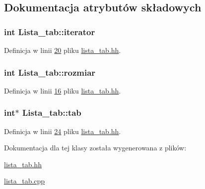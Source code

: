 \subsection{Dokumentacja atrybutów składowych}
\hypertarget{class_lista__tab_afd2c6ba3ae15e658890641b188c7ed39}{
\subsubsection[{iterator}]{\setlength{\rightskip}{0pt plus 5cm}int Lista\-\_\-tab\-::iterator}}\label{class_lista__tab_afd2c6ba3ae15e658890641b188c7ed39}


Definicja w linii \hyperlink{lista__tab_8hh_source_l00020}{20} pliku \hyperlink{lista__tab_8hh_source}{lista\-\_\-tab.\-hh}.

\hypertarget{class_lista__tab_a59e0425d896070457d1f3456b91842fd}{
\subsubsection[{rozmiar}]{\setlength{\rightskip}{0pt plus 5cm}int Lista\-\_\-tab\-::rozmiar}}\label{class_lista__tab_a59e0425d896070457d1f3456b91842fd}


Definicja w linii \hyperlink{lista__tab_8hh_source_l00016}{16} pliku \hyperlink{lista__tab_8hh_source}{lista\-\_\-tab.\-hh}.

\hypertarget{class_lista__tab_a123dfb670e5a5592e512c41cc4faf14e}{
\subsubsection[{tab}]{\setlength{\rightskip}{0pt plus 5cm}int$\ast$ Lista\-\_\-tab\-::tab}}\label{class_lista__tab_a123dfb670e5a5592e512c41cc4faf14e}


Definicja w linii \hyperlink{lista__tab_8hh_source_l00024}{24} pliku \hyperlink{lista__tab_8hh_source}{lista\-\_\-tab.\-hh}.



Dokumentacja dla tej klasy została wygenerowana z plików\-:\begin{DoxyCompactItemize}
\item 
\hyperlink{lista__tab_8hh}{lista\-\_\-tab.\-hh}\item 
\hyperlink{lista__tab_8cpp}{lista\-\_\-tab.\-cpp}\end{DoxyCompactItemize}
